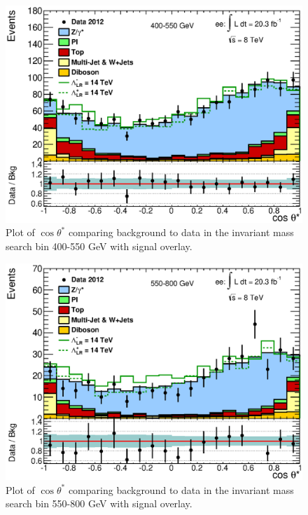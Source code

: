 





	\begin{figure}[ht]
		\centering
			\includegraphics[width=0.9\linewidth]{images/CosThetaStar_bin_1.eps}
		\caption{Plot of $\cos{\theta^{*}}$ comparing background to data in the invariant mass search bin 400-550 GeV with signal overlay.}
		\label{fig:cosTS_1}
	\end{figure}

	\begin{figure}[ht]
		\centering
			\includegraphics[width=0.9\linewidth]{images/CosThetaStar_bin_2.eps}
		\caption{Plot of $\cos{\theta^{*}}$ comparing background to data in the invariant mass search bin 550-800 GeV with signal overlay.}
		\label{fig:cosTS_2}
	\end{figure}


